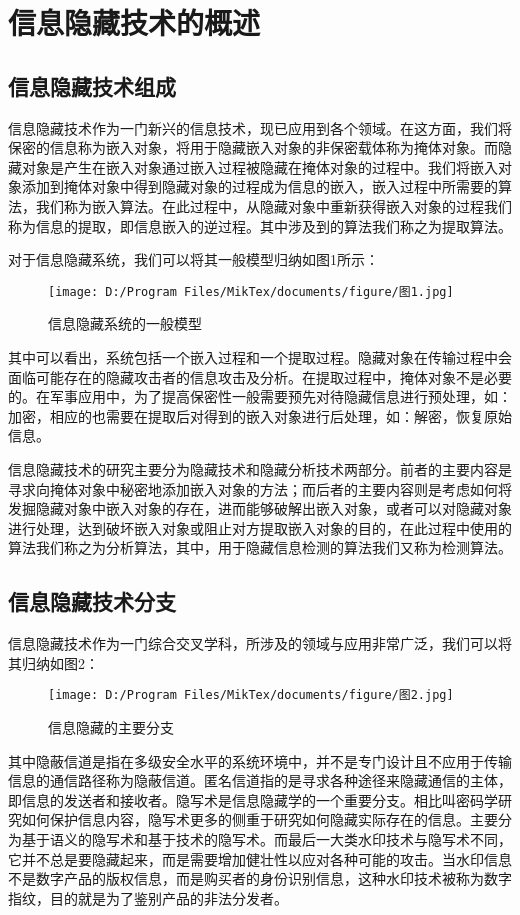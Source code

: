 	\section{信息隐藏技术的概述}
    \subsection{信息隐藏技术组成} 
    信息隐藏技术作为一门新兴的信息技术\cite{ref1}，现已应用到各个领域。在这方面，我们将保密的信息称为嵌入对象，将用于隐藏嵌入对象的非保密载体称为掩体对象。而隐藏对象是产生在嵌入对象通过嵌入过程被隐藏在掩体对象的过程中。我们将嵌入对象添加到掩体对象中得到隐藏对象的过程成为信息的嵌入，嵌入过程中所需要的算法，我们称为嵌入算法。在此过程中，从隐藏对象中重新获得嵌入对象的过程我们称为信息的提取，即信息嵌入的逆过程。其中涉及到的算法我们称之为提取算法。
    \par 对于信息隐藏系统，我们可以将其一般模型归纳如图1所示：
    \begin{figure}[!ht]\centering   %
    \texttt{[image: D:/Program Files/MikTex/documents/figure/图1.jpg]}%
    \caption{信息隐藏系统的一般模型}
    \end{figure}
    \par\noindent 其中可以看出，系统包括一个嵌入过程和一个提取过程。隐藏对象在传输过程中会面临可能存在的隐藏攻击者的信息攻击及分析。在提取过程中，掩体对象不是必要的。在军事应用中，为了提高保密性一般需要预先对待隐藏信息进行预处理，如：加密，相应的也需要在提取后对得到的嵌入对象进行后处理，如：解密，恢复原始信息。
    \par 信息隐藏技术的研究主要分为隐藏技术和隐藏分析技术两部分\cite{ref2}。前者的主要内容是寻求向掩体对象中秘密地添加嵌入对象的方法；而后者的主要内容则是考虑如何将发掘隐藏对象中嵌入对象的存在，进而能够破解出嵌入对象，或者可以对隐藏对象进行处理，达到破坏嵌入对象或阻止对方提取嵌入对象的目的，在此过程中使用的算法我们称之为分析算法，其中，用于隐藏信息检测的算法我们又称为检测算法\cite{ref3}。
    \subsection{信息隐藏技术分支} 
    信息隐藏技术作为一门综合交叉学科，所涉及的领域与应用非常广泛，我们可以将其归纳如图2：
    \begin{figure}[!ht]\centering   %
    \texttt{[image: D:/Program Files/MikTex/documents/figure/图2.jpg]}%
    \caption{信息隐藏的主要分支}
    \end{figure}
    \par\noindent 其中隐蔽信道是指在多级安全水平的系统环境中，并不是专门设计且不应用于传输信息的通信路径称为隐蔽信道。匿名信道指的是寻求各种途径来隐藏通信的主体，即信息的发送者和接收者。隐写术是信息隐藏学的一个重要分支。相比叫密码学研究如何保护信息内容，隐写术更多的侧重于研究如何隐藏实际存在的信息。主要分为基于语义的隐写术和基于技术的隐写术。而最后一大类水印技术与隐写术不同，它并不总是要隐藏起来，而是需要增加健壮性以应对各种可能的攻击。当水印信息不是数字产品的版权信息，而是购买者的身份识别信息，这种水印技术被称为数字指纹，目的就是为了鉴别产品的非法分发者。
